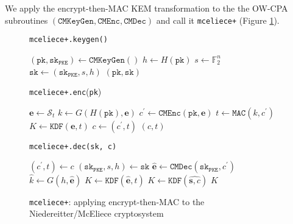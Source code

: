 \documentclass[runningheads]{llncs}
\newcommand{\pke}{\texttt{PKE}}
\newcommand{\mac}{\texttt{MAC}}
\newcommand{\pk}{\texttt{pk}}
\newcommand{\sk}{\texttt{sk}}
\begin{document}
We apply the encrypt-then-MAC KEM transformation to the the OW-CPA subroutines $(\texttt{CMKeyGen}, \texttt{CMEnc}, \texttt{CMDec})$ and call it \texttt{mceliece+} (Figure \ref{fig:mceliece-plus}).

\begin{figure}[h]
    \centering
    
    \begin{minipage}[t]{0.34\textwidth}
        \begin{algorithm}[H]
            \caption*{\texttt{mceliece+.keygen()}}
            \begin{algorithmic}[1]
                \State $(\pk, \sk_\pke) \leftarrow \texttt{CMKeyGen}()$
                \State $h \leftarrow H(\pk)$
                \State $s \leftarrow \mathbb{F}_2^n$
                \State $\sk \leftarrow (\sk_\pke, s, h)$
                \State \Return $(\pk, \sk)$
            \end{algorithmic}
        \end{algorithm}
    \end{minipage}\hfill
    \begin{minipage}[t]{0.28\textwidth}
    \begin{algorithm}[H]
        \caption*{\texttt{mceliece+.enc}(\pk)}
        \begin{algorithmic}[1]
            \State $\mathbf{e} \leftarrow \mathcal{S}_t$
            \State $k \leftarrow G(H(\pk), \mathbf{e})$
            \State $c^\prime \leftarrow \texttt{CMEnc}(\pk, \mathbf{e})$
            \State $t \leftarrow \mac(k, c^\prime)$
            \State $K \leftarrow \texttt{KDF}(\mathbf{e}, t)$
            \State $c \leftarrow (c^\prime, t)$
            \State \Return $(c, t)$
        \end{algorithmic}
    \end{algorithm}
    \end{minipage}\hfill
    \begin{minipage}[t]{0.33\textwidth}
    \begin{algorithm}[H]
        \caption*{\texttt{mceliece+.dec(sk, c)}}
        \begin{algorithmic}[1]
            \State $(c^\prime, t) \leftarrow c$
            \State $(\sk_\pke, s, h) \leftarrow \sk$
            \State $\hat{\mathbf{e}} \leftarrow \texttt{CMDec}(\sk_\pke, c^\prime)$
            \State $\hat{k} \leftarrow G(h, \hat{\mathbf{e}})$
            \If{$\mac(\hat{k}, c^\prime) = t$}
                \State $K \leftarrow \texttt{KDF}(\hat{\mathbf{e}}, t)$
            \Else
                \State $K \leftarrow \texttt{KDF}(\hat{\mathbf{s}, c})$
            \EndIf
            \State \Return $K$
        \end{algorithmic}
    \end{algorithm}
    \end{minipage}

    \caption{\texttt{mceliece+}: applying encrypt-then-MAC to the Niedereitter/McEliece cryptosystem}\label{fig:mceliece-plus}
\end{figure}
\end{document}
